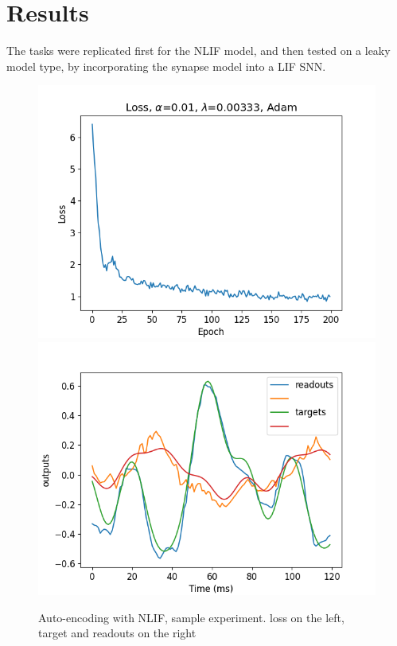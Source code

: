\documentclass[mphil,deptreport,ianc]{infthesis} %
\begin{document}
\section{Results}

The tasks were replicated first for the NLIF model, and then tested on a leaky model type, by incorporating the synapse model into a LIF SNN.

\begin{figure}
    \centering
    \includegraphics[width=0.49\columnwidth]{figures/Gating/AutoEncoding/NLIF_sample/plot_loss_test_mt_NLIF_et_AutoEncoding_N_30_titers_200.png}
    \includegraphics[width=0.49\columnwidth]{figures/Gating/AutoEncoding/NLIF_sample/test_plot_outputs_NLIF_seed_23.png}
    \caption{Auto-encoding with NLIF, sample experiment. loss on the left, target and readouts on the right}
    \label{fig:autoencoding_NLIF}
\end{figure}
\end{document}
